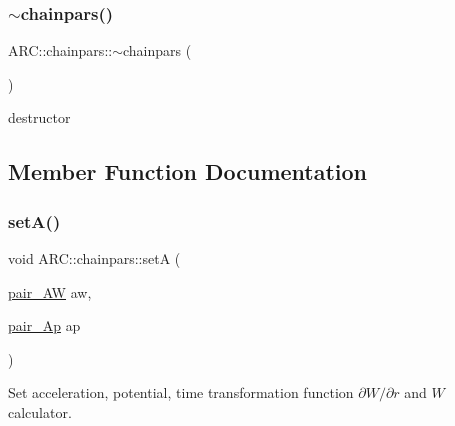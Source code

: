 \hypertarget{classARC_1_1chainpars_a032873f782645efb6e60dc77f6d425dc}{}\label{classARC_1_1chainpars_a032873f782645efb6e60dc77f6d425dc} 
\subsubsection{\texorpdfstring{$\sim$chainpars()}{~chainpars()}}
{\footnotesize\ttfamily A\+R\+C\+::chainpars\+::$\sim$chainpars (\begin{DoxyParamCaption}{ }\end{DoxyParamCaption})\hspace{0.3cm}{\ttfamily [inline]}}



destructor 



\subsection{Member Function Documentation}
\hypertarget{classARC_1_1chainpars_af639f7bc8cfbb2a0330f079df2fd556e}{}\label{classARC_1_1chainpars_af639f7bc8cfbb2a0330f079df2fd556e} 
\subsubsection{\texorpdfstring{set\+A()}{setA()}}
{\footnotesize\ttfamily void A\+R\+C\+::chainpars\+::setA (\begin{DoxyParamCaption}\item[{\hyperlink{namespaceARC_a5c4308ca4a8d0e0ff59fdce30f00274c}{pair\+\_\+\+AW}}]{aw,  }\item[{\hyperlink{namespaceARC_aed8f19a0c6ae7dc0bb3696b337d7b9f6}{pair\+\_\+\+Ap}}]{ap }\end{DoxyParamCaption})\hspace{0.3cm}{\ttfamily [inline]}}



Set acceleration, potential, time transformation function $\partial W/\partial r$ and $W$ calculator. 

